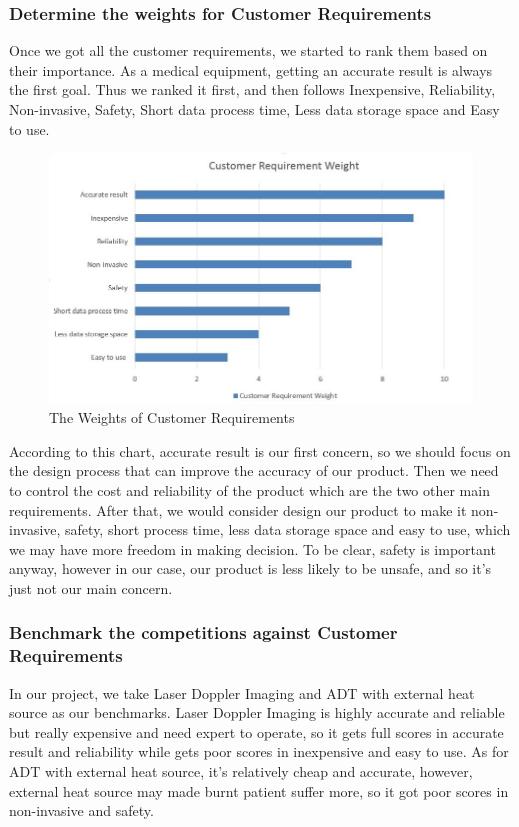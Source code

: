 \documentclass[paper=letter, fontsize=11pt]{scrartcl}
\numberwithin{equation}{section}		%
\numberwithin{figure}{section}			%
\numberwithin{table}{section}			%
\begin{document}
\subsubsection{Determine the weights for Customer Requirements}
Once we got all the customer requirements, we started to rank them based on their importance. As a medical equipment, getting an accurate result is always the first goal. Thus we ranked it first, and then follows Inexpensive, Reliability, Non-invasive, Safety, Short data process time, Less data storage space and Easy to use.

\begin{figure}[H]
    \centering
	\includegraphics[scale=1]{CRweight.jpg}
	\caption{The Weights of Customer Requirements}
\end{figure}
According to this chart, accurate result is our first concern, so we should focus on the design process that can improve the accuracy of our product. Then we need to control the cost and reliability of the product which are the two other main requirements. After that, we would consider design our product to make it non-invasive, safety, short process time, less data storage space and easy to use, which we may have more freedom in making decision. To be clear, safety is important anyway, however in our case, our product is less likely to be unsafe, and so it’s just not our main concern. 

\subsubsection{Benchmark the competitions against Customer Requirements}
In our project, we take Laser Doppler Imaging and ADT with external heat source as our benchmarks. Laser Doppler Imaging is highly accurate and reliable but really expensive and need expert to operate, so it gets full scores in accurate result and reliability while gets poor scores in inexpensive and easy to use. As for ADT with external heat source, it’s relatively cheap and accurate, however, external heat source may made burnt patient suffer more, so it got poor scores in non-invasive and safety.
\end{document}
